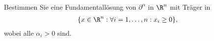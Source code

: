 
\begin{exercise}

Bestimmen Sie eine Fundamentallösung von $\partial^{\alpha}$ in $\R^n$ mit Träger in
\begin{align*}
  \{x \in \R^n: \forall i = 1,\dots,n: x_i \geq 0 \},
\end{align*}
wobei alle $\alpha_i > 0$ sind.
\end{exercise}


\begin{solution}

\phantom{}

\end{solution}

